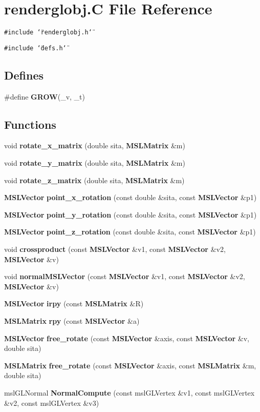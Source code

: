 \section{renderglobj.C File Reference}
\label{renderglobj_8C}
{\tt \#include \char`\"{}renderglobj.h\char`\"{}}\par
{\tt \#include \char`\"{}defs.h\char`\"{}}\par
\subsection*{Defines}
\begin{CompactItemize}
\item 
\#define {\bf GROW}(\_\-v, \_\-t)
\end{CompactItemize}
\subsection*{Functions}
\begin{CompactItemize}
\item 
void {\bf rotate\_\-x\_\-matrix} (double sita, {\bf MSLMatrix} \&m)
\item 
void {\bf rotate\_\-y\_\-matrix} (double sita, {\bf MSLMatrix} \&m)
\item 
void {\bf rotate\_\-z\_\-matrix} (double sita, {\bf MSLMatrix} \&m)
\item 
{\bf MSLVector} {\bf point\_\-x\_\-rotation} (const double \&sita, const {\bf MSLVector} \&p1)
\item 
{\bf MSLVector} {\bf point\_\-y\_\-rotation} (const double \&sita, const {\bf MSLVector} \&p1)
\item 
{\bf MSLVector} {\bf point\_\-z\_\-rotation} (const double \&sita, const {\bf MSLVector} \&p1)
\item 
void {\bf crossproduct} (const {\bf MSLVector} \&v1, const {\bf MSLVector} \&v2, {\bf MSLVector} \&v)
\item 
void {\bf normal\-MSLVector} (const {\bf MSLVector} \&v1, const {\bf MSLVector} \&v2, {\bf MSLVector} \&v)
\item 
{\bf MSLVector} {\bf irpy} (const {\bf MSLMatrix} \&R)
\item 
{\bf MSLMatrix} {\bf rpy} (const {\bf MSLVector} \&a)
\item 
{\bf MSLVector} {\bf free\_\-rotate} (const {\bf MSLVector} \&axis, const {\bf MSLVector} \&v, double sita)
\item 
{\bf MSLMatrix} {\bf free\_\-rotate} (const {\bf MSLVector} \&axis, const {\bf MSLMatrix} \&m, double sita)
\item 
msl\-GLNormal {\bf Normal\-Compute} (const msl\-GLVertex \&v1, const msl\-GLVertex \&v2, const msl\-GLVertex \&v3)
\end{CompactItemize}


